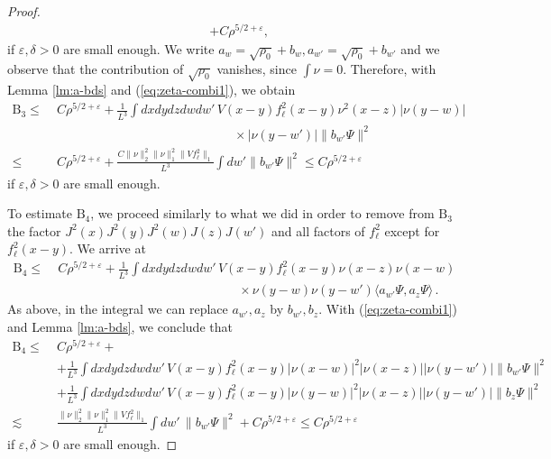 \documentclass[a4paper,11pt]{article}
\def\eps{\varepsilon}
\numberwithin{equation}{section}
\begin{document}
\begin{proof}
\[\begin{split}
&+ C \rho^{5/2+\eps},
\end{split}  \]
if $\eps, \delta > 0$ are small enough. We write $a_w = \sqrt{\rho_0} + b_w, a_{w'} = \sqrt{\rho_0} + b_{w'}$ and we observe that the contribution of $\sqrt{\rho_0}$ vanishes, since $\int \nu = 0$. Therefore, with Lemma \ref{lm:a-bds} and (\ref{eq:zeta-combi1}), we obtain 
\[ \begin{split} \text{B}_3 \leq \; &C\rho^{5/2+\eps} + \frac{1}{L^3} \int  dx dy dz dw dw' \, V(x-y) f_\ell^2(x-y) \nu^2 (x-z) |\nu (y-w)| \\
&\qquad\qquad\qquad\qquad\qquad\qquad\qquad\times|\nu (y-w')| \| b_{w'} \Psi \|^2 \\
 \leq \; & C \rho^{5/2+\eps} + \frac{C \| \nu \|_2^2 \| \nu \|_1^2\|Vf_\ell^2\|_1}{L^3} \int dw' \| b_{w'} \Psi \|^2 \leq C  \rho^{5/2+\eps} \end{split}  \] 
if $\eps, \delta > 0$ are small enough. 

To estimate $\text{B}_4$, we proceed similarly to what we did in order to remove from $\text{B}_3$ the factor $J^2 (x) J^2 (y) J^2 (w) J(z) J(w')$ and all factors of $f_\ell^2$ except for $f_\ell^2(x-y)$. We arrive at 
\[  \begin{split} \text{B}_4 \leq \; &C \rho^{5/2+\eps} + \frac{1}{L^3} \int dx dy dz dw dw' \, V (x-y) f_\ell^2 (x-y)  \nu (x-z) \nu (x-w) \\ &\hspace{6cm} \times \nu (y-w) \nu (y-w') \langle a_{w'} \Psi , a_z \Psi \rangle \, . \end{split} \]
As above, in the integral we can replace $a_{w'}, a_z$ by $b_{w'}, b_z$. With (\ref{eq:zeta-combi1}) and Lemma \ref{lm:a-bds}, we conclude that 
\[ \begin{split} \text{B}_4 \leq \; &C \rho^{5/2+\eps}+\\
&+\frac{1}{L^3} \int dx dy dz dw dw' \, V(x-y)f_\ell^2(x-y) |\nu (x-w)|^2 |\nu (x-z)| |\nu (y-w')| \| b_{w'} \Psi \|^2 \\ &+ \frac{1}{L^3}  \int dx dy dz dw dw' \, V(x-y)f_\ell^2(x-y) |\nu (y-w)|^2 |\nu (x-z)| |\nu (y-w')| \| b_{z} \Psi \|^2  \\ \lesssim \; &\frac{\| \nu \|_2^2 \| \nu \|_1^2 \|Vf_\ell^2\|_1}{L^3}  \int dw' \, \| b_{w'} \Psi \|^2 + C \rho^{5/2 + \eps} \leq C \rho^{5/2+\eps} \end{split} \]
if $\eps, \delta > 0$ are small enough. 


\end{proof}
\end{document}
